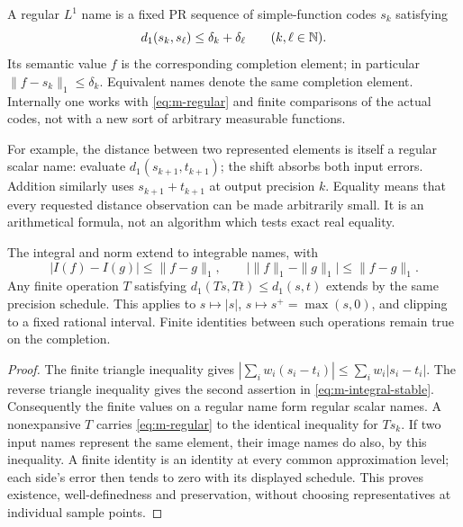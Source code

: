 \begin{definition}
A regular $L^1$ name is a fixed PR sequence of simple-function codes
$s_k$ satisfying
\begin{equation}
 d_1(s_k,s_\ell)\le\delta_k+\delta_\ell
 \qquad(k,\ell\in\mathbb N).
 \label{eq:m-regular}
\end{equation}
Its semantic value $f$ is the corresponding completion element; in
particular $\|f-s_k\|_1\le\delta_k$.  Equivalent names denote the same
completion element.  Internally one works with
\eqref{eq:m-regular} and finite comparisons of the actual codes, not with
a new sort of arbitrary measurable functions.
\end{definition}

For example, the distance between two represented elements is itself a
regular scalar name: evaluate $d_1(s_{k+1},t_{k+1})$; the shift absorbs
both input errors.  Addition similarly uses $s_{k+1}+t_{k+1}$ at output
precision $k$.  Equality means that every requested
distance observation can be made arbitrarily small.  It is an arithmetical
formula, not an algorithm which tests exact real equality.

\begin{lemma}
\label{lem:m-extension}
The integral and norm extend to integrable names, with
\begin{equation}
 |I(f)-I(g)|\le\|f-g\|_1,\qquad
 \bigl|\|f\|_1-\|g\|_1\bigr|\le\|f-g\|_1.
 \label{eq:m-integral-stable}
\end{equation}
Any finite operation $T$ satisfying
$d_1(Ts,Tt)\le d_1(s,t)$ extends by the same precision schedule.  This
applies to $s\mapsto |s|$, $s\mapsto s^+=\max(s,0)$, and clipping to a
fixed rational interval.  Finite identities between such operations
remain true on the completion.
\end{lemma}

\begin{proof}
The finite triangle inequality gives
$|\sum_iw_i(s_i-t_i)|\le\sum_iw_i|s_i-t_i|$.  The reverse triangle
inequality gives the second assertion in \eqref{eq:m-integral-stable}.
Consequently the finite values on a regular name form regular scalar
names.  A nonexpansive $T$ carries \eqref{eq:m-regular} to the identical
inequality for $Ts_k$.  If two input names represent the same element,
their image names do also, by this inequality.  A finite identity is an
identity at every common approximation level; each side's error then tends
to zero with its displayed schedule.  This proves existence,
well-definedness and preservation, without choosing representatives at
individual sample points.
\end{proof}

